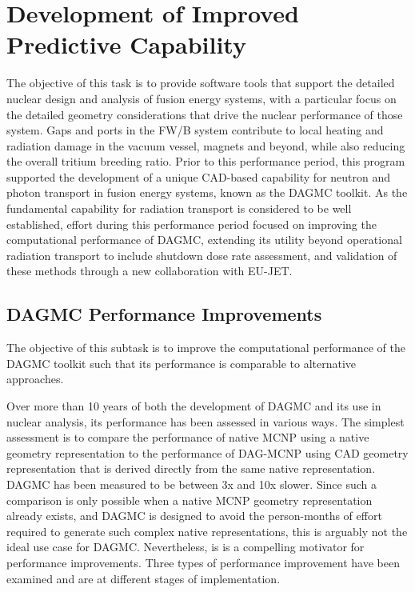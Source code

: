 \section{Development of Improved Predictive Capability}

The objective of this task is to provide software tools that support the
detailed nuclear design and analysis of fusion energy systems, with a
particular focus on the detailed geometry considerations that drive the
nuclear performance of those system.  Gaps and ports in the \gls{FW/B} system
contribute to local heating and radiation damage in the vacuum vessel, magnets
and beyond, while also reducing the overall tritium breeding ratio.  Prior to
this performance period, this program supported the development of a unique
CAD-based capability for neutron and photon transport in fusion energy
systems, known as the \gls{DAGMC} toolkit.
As the fundamental capability for radiation transport is considered to be well
established, effort during this performance period focused on improving the
computational performance of \gls{DAGMC}, extending its utility beyond
operational radiation transport to include shutdown dose rate assessment, and
validation of these methods through a new collaboration with EU-JET.

\subsection{\gls{DAGMC} Performance Improvements}

The objective of this subtask is to improve the computational performance of
the \gls{DAGMC} toolkit such that its performance is comparable to alternative
approaches.

Over more than 10 years of both the development of \gls{DAGMC} and its use in
nuclear analysis, its performance has been assessed in various ways.  The
simplest assessment is to compare the performance of native MCNP using a
native geometry representation to the performance of DAG-MCNP using CAD
geometry representation that is derived directly from the same native
representation.  \gls{DAGMC} has been measured to be between \textapprox 3x
and \textapprox 10x slower.  Since such a comparison is only possible when a
native MCNP geometry representation already exists, and \gls{DAGMC} is
designed to avoid the person-months of effort required to generate such
complex native representations, this is arguably not the ideal use case for
\gls{DAGMC}.  Nevertheless, is is a compelling motivator for performance
improvements.  Three types of performance improvement have been examined and
are at different stages of implementation.

